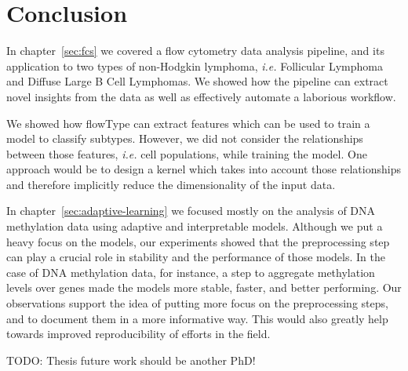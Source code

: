 \chapter{Conclusion}
In chapter~\ref{sec:fcs} we covered a flow cytometry data analysis pipeline, and
its application to two types of non-Hodgkin lymphoma, \emph{i.e.} Follicular
Lymphoma and Diffuse Large B Cell Lymphomas. We showed how the pipeline can
extract novel insights from the data as well as effectively automate a laborious
workflow.

We showed how flowType can extract features which can be used to train a model
to classify subtypes. However, we did not consider the relationships between
those features, \emph{i.e.} cell populations, while training the model. One
approach would be to design a kernel which takes into account those
relationships and therefore implicitly reduce the dimensionality of the input
data.

In chapter~\ref{sec:adaptive-learning} we focused mostly on the analysis of DNA
methylation data using adaptive and interpretable models. Although we put a
heavy focus on the models, our experiments showed that the preprocessing step
can play a crucial role in stability and the performance of those models. In the
case of DNA methylation data, for instance, a step to aggregate methylation
levels over genes made the models more stable, faster, and better performing.
Our observations support the idea of putting more focus on the preprocessing
steps, and to document them in a more informative way. This would also greatly
help towards improved reproducibility of efforts in the field.

TODO: Thesis future work should be another PhD!
